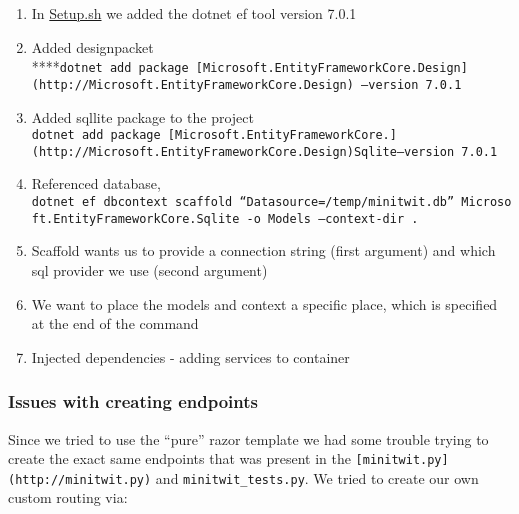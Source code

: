 \begin{enumerate}
    \item In \href{http://Setup.sh}{Setup.sh} we added the dotnet ef tool version 7.0.1
    \item Added designpacket ****\texttt{dotnet\ add\ package\ {[}Microsoft.EntityFrameworkCore.Design{]}(http://Microsoft.EntityFrameworkCore.Design)\ —version\ 7.0.1}
    \item Added sqllite package to the project \texttt{dotnet\ add\ package\ {[}Microsoft.EntityFrameworkCore.{]}(http://Microsoft.EntityFrameworkCore.Design)Sqlite—version\ 7.0.1}
    \item Referenced database, \texttt{dotnet\ ef\ dbcontext\ scaffold\ “Datasource=/temp/minitwit.db”\ Microsoft.EntityFrameworkCore.Sqlite\ -o\ Models\ —context-dir\ .}
    \item Scaffold wants us to provide a connection string (first argument) and which sql provider we use (second argument)
    \item We want to place the models and context a specific place, which is specified at the end of the command
    \item Injected dependencies - adding services to container
\end{enumerate}

\subsubsection{Issues with creating
endpoints}
\label{log:issues-with-creating-endpoints}

Since we tried to use the ``pure'' razor template we had some trouble trying to create the exact same endpoints that was present in the \texttt{{[}minitwit.py{]}(http://minitwit.py)} and \texttt{minitwit\_tests.py}. We tried to create our own custom routing via:



